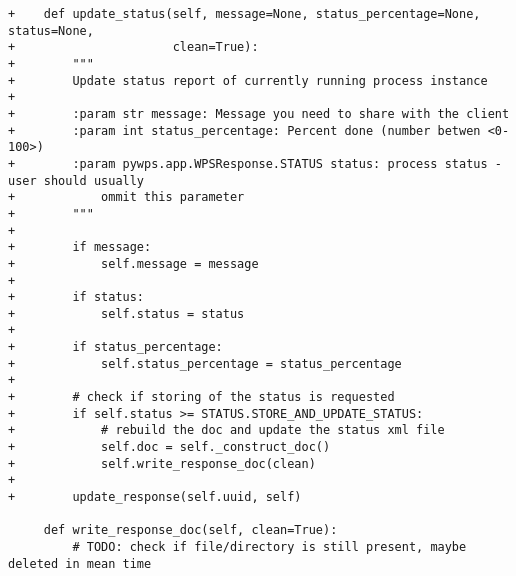 \begin{lstlisting}[basicstyle=\small,caption={pywps diff file}]
+    def update_status(self, message=None, status_percentage=None, status=None,
+                      clean=True):
+        """
+        Update status report of currently running process instance
+
+        :param str message: Message you need to share with the client
+        :param int status_percentage: Percent done (number betwen <0-100>)
+        :param pywps.app.WPSResponse.STATUS status: process status - user should usually
+            ommit this parameter
+        """
+
+        if message:
+            self.message = message
+
+        if status:
+            self.status = status
+
+        if status_percentage:
+            self.status_percentage = status_percentage
+
+        # check if storing of the status is requested
+        if self.status >= STATUS.STORE_AND_UPDATE_STATUS:
+            # rebuild the doc and update the status xml file
+            self.doc = self._construct_doc()
+            self.write_response_doc(clean)
+
+        update_response(self.uuid, self)
 
     def write_response_doc(self, clean=True):
         # TODO: check if file/directory is still present, maybe deleted in mean time
\end{lstlisting}

\newpage
